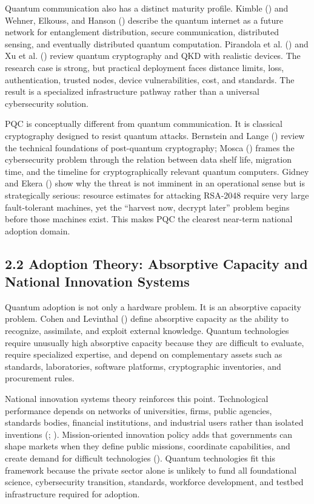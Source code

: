 \documentclass[
  11pt,
  letterpaper,
]{article}
\begin{document}
Quantum communication also has a distinct maturity profile. Kimble
() and Wehner, Elkouss, and Hanson
() describe the quantum internet as a
future network for entanglement distribution, secure communication,
distributed sensing, and eventually distributed quantum computation.
Pirandola et al. () and Xu et al.
() review quantum cryptography and QKD with
realistic devices. The research case is strong, but practical deployment
faces distance limits, loss, authentication, trusted nodes, device
vulnerabilities, cost, and standards. The result is a specialized
infrastructure pathway rather than a universal cybersecurity solution.

PQC is conceptually different from quantum communication. It is
classical cryptography designed to resist quantum attacks. Bernstein and
Lange () review the technical
foundations of post-quantum cryptography; Mosca
() frames the cybersecurity problem
through the relation between data shelf life, migration time, and the
timeline for cryptographically relevant quantum computers. Gidney and
Ekera () show why the threat is not
imminent in an operational sense but is strategically serious: resource
estimates for attacking RSA-2048 require very large fault-tolerant
machines, yet the ``harvest now, decrypt later'' problem begins before
those machines exist. This makes PQC the clearest near-term national
adoption domain.

\subsection{2.2 Adoption Theory: Absorptive Capacity and National
Innovation
Systems}\label{adoption-theory-absorptive-capacity-and-national-innovation-systems}

Quantum adoption is not only a hardware problem. It is an absorptive
capacity problem. Cohen and Levinthal ()
define absorptive capacity as the ability to recognize, assimilate, and
exploit external knowledge. Quantum technologies require unusually high
absorptive capacity because they are difficult to evaluate, require
specialized expertise, and depend on complementary assets such as
standards, laboratories, software platforms, cryptographic inventories,
and procurement rules.

National innovation systems theory reinforces this point. Technological
performance depends on networks of universities, firms, public agencies,
standards bodies, financial institutions, and industrial users rather
than isolated inventions (;
). Mission-oriented innovation
policy adds that governments can shape markets when they define public
missions, coordinate capabilities, and create demand for difficult
technologies (). Quantum
technologies fit this framework because the private sector alone is
unlikely to fund all foundational science, cybersecurity transition,
standards, workforce development, and testbed infrastructure required
for adoption.
\end{document}
